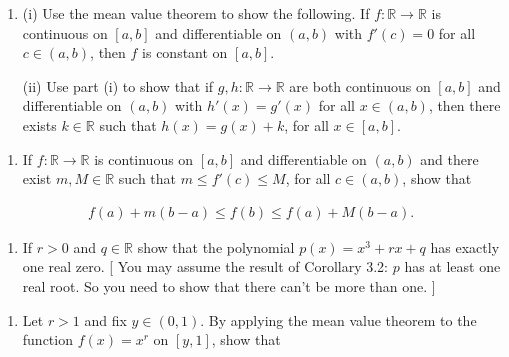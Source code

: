 \documentclass[letterpaper,10pt,english]{jupyterBook}
\begin{document}
\label{\detokenize{Problems:id49}}\begin{enumerate}
%
\setcounter{enumi}{48}
\item {} 
\sphinxAtStartPar
(i) Use the mean value theorem to show the following. If \(f:\mathbb{R} \rightarrow \mathbb{R}\) is continuous on \([a, b]\) and differentiable on \((a, b)\) with \(f'(c)= 0\) for all \(c \in (a, b)\), then \(f\) is constant on \([a, b]\).

\sphinxAtStartPar
(ii) Use part (i) to show that if \(g, h:\mathbb{R}\to\mathbb{R}\) are both continuous on \([a, b]\) and differentiable on \((a, b)\) with \(h'(x) = g'(x)\) for all \(x \in (a, b)\), then there exists \(k \in \mathbb{R}\) such that \(h(x) = g(x) + k\), for all \(x \in [a, b]\).

\end{enumerate}
\label{\detokenize{Problems:id50}}\begin{enumerate}
%
\setcounter{enumi}{49}
\item {} 
\sphinxAtStartPar
If \(f:\mathbb{R} \rightarrow \mathbb{R}\) is continuous on \([a, b]\) and differentiable on \((a, b)\) and there exist \(m, M \in \mathbb{R}\) such that \(m \leq f'(c) \leq M\), for all \(c \in (a, b)\), show that

\end{enumerate}
\begin{equation*}
\begin{split}
f(a) + m(b - a) \leq f(b) \leq f(a) + M(b-a).
\end{split}
\end{equation*}\label{\detokenize{Problems:id51}}\begin{enumerate}
%
\setcounter{enumi}{50}
\item {} 
\sphinxAtStartPar
If \(r > 0\) and \(q \in \mathbb{R}\) show that the polynomial \(p(x) = x^{3} + rx + q\) has exactly one real zero.
{[} You may assume the result of Corollary 3.2: \(p\) has at least one real root. So you need to show that there can’t be more than one. {]}

\end{enumerate}
\label{\detokenize{Problems:id52}}\begin{enumerate}
%
\setcounter{enumi}{51}
\item {} 
\sphinxAtStartPar
Let \(r>1\) and fix \(y\in (0,1)\). By applying the mean value theorem to the function \(f(x)=x^r\) on \([y,1]\), show that

\end{enumerate}
\end{document}
